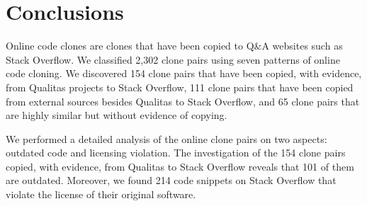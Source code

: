 \documentclass[10pt,journal,compsoc]{IEEEtran}
\begin{document}
%

\section{Conclusions}

Online code clones are clones that have been copied to Q\&A websites
such as Stack Overflow. 
We classified 2,302 clone pairs using seven patterns of online code
cloning. We discovered 154 clone pairs that have been
copied, with evidence, from Qualitas projects to Stack Overflow, 111
clone pairs that have been copied from external sources besides
Qualitas to Stack Overflow, and 65 clone pairs that are highly
similar but without evidence of copying.

We performed a detailed analysis of the online clone pairs on two
aspects: outdated code and licensing violation. The investigation of
the 154 clone pairs copied, with evidence, from Qualitas to Stack
Overflow reveals that 101 of them are outdated.  Moreover, we found 214
code snippets on Stack Overflow that violate the license of their
original software.
\end{document}
